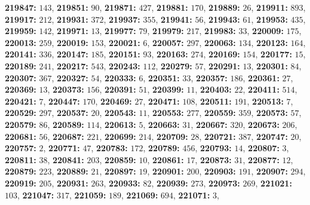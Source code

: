 \textsf{\bfseries 219847:} $143$, \textsf{\bfseries 219851:} $90$, \textsf{\bfseries 219871:} $427$, \textsf{\bfseries 219881:} $170$, \textsf{\bfseries 219889:} $26$, \textsf{\bfseries 219911:} $893$, \textsf{\bfseries 219917:} $212$, \textsf{\bfseries 219931:} $372$, \textsf{\bfseries 219937:} $355$, \textsf{\bfseries 219941:} $56$, \textsf{\bfseries 219943:} $61$, \textsf{\bfseries 219953:} $435$, \textsf{\bfseries 219959:} $142$, \textsf{\bfseries 219971:} $13$, \textsf{\bfseries 219977:} $79$, \textsf{\bfseries 219979:} $217$, \textsf{\bfseries 219983:} $33$, \textsf{\bfseries 220009:} $175$, \textsf{\bfseries 220013:} $259$, \textsf{\bfseries 220019:} $153$, \textsf{\bfseries 220021:} $6$, \textsf{\bfseries 220057:} $297$, \textsf{\bfseries 220063:} $134$, \textsf{\bfseries 220123:} $164$, \textsf{\bfseries 220141:} $336$, \textsf{\bfseries 220147:} $185$, \textsf{\bfseries 220151:} $93$, \textsf{\bfseries 220163:} $274$, \textsf{\bfseries 220169:} $154$, \textsf{\bfseries 220177:} $15$, \textsf{\bfseries 220189:} $241$, \textsf{\bfseries 220217:} $543$, \textsf{\bfseries 220243:} $112$, \textsf{\bfseries 220279:} $57$, \textsf{\bfseries 220291:} $13$, \textsf{\bfseries 220301:} $84$, \textsf{\bfseries 220307:} $367$, \textsf{\bfseries 220327:} $54$, \textsf{\bfseries 220333:} $6$, \textsf{\bfseries 220351:} $33$, \textsf{\bfseries 220357:} $186$, \textsf{\bfseries 220361:} $27$, \textsf{\bfseries 220369:} $13$, \textsf{\bfseries 220373:} $156$, \textsf{\bfseries 220391:} $51$, \textsf{\bfseries 220399:} $11$, \textsf{\bfseries 220403:} $22$, \textsf{\bfseries 220411:} $514$, \textsf{\bfseries 220421:} $7$, \textsf{\bfseries 220447:} $170$, \textsf{\bfseries 220469:} $27$, \textsf{\bfseries 220471:} $108$, \textsf{\bfseries 220511:} $191$, \textsf{\bfseries 220513:} $7$, \textsf{\bfseries 220529:} $297$, \textsf{\bfseries 220537:} $20$, \textsf{\bfseries 220543:} $11$, \textsf{\bfseries 220553:} $277$, \textsf{\bfseries 220559:} $359$, \textsf{\bfseries 220573:} $57$, \textsf{\bfseries 220579:} $86$, \textsf{\bfseries 220589:} $114$, \textsf{\bfseries 220613:} $5$, \textsf{\bfseries 220663:} $31$, \textsf{\bfseries 220667:} $320$, \textsf{\bfseries 220673:} $206$, \textsf{\bfseries 220681:} $56$, \textsf{\bfseries 220687:} $221$, \textsf{\bfseries 220699:} $214$, \textsf{\bfseries 220709:} $28$, \textsf{\bfseries 220721:} $387$, \textsf{\bfseries 220747:} $20$, \textsf{\bfseries 220757:} $2$, \textsf{\bfseries 220771:} $47$, \textsf{\bfseries 220783:} $172$, \textsf{\bfseries 220789:} $456$, \textsf{\bfseries 220793:} $14$, \textsf{\bfseries 220807:} $3$, \textsf{\bfseries 220811:} $38$, \textsf{\bfseries 220841:} $203$, \textsf{\bfseries 220859:} $10$, \textsf{\bfseries 220861:} $17$, \textsf{\bfseries 220873:} $31$, \textsf{\bfseries 220877:} $12$, \textsf{\bfseries 220879:} $223$, \textsf{\bfseries 220889:} $21$, \textsf{\bfseries 220897:} $19$, \textsf{\bfseries 220901:} $200$, \textsf{\bfseries 220903:} $191$, \textsf{\bfseries 220907:} $294$, \textsf{\bfseries 220919:} $205$, \textsf{\bfseries 220931:} $263$, \textsf{\bfseries 220933:} $82$, \textsf{\bfseries 220939:} $273$, \textsf{\bfseries 220973:} $269$, \textsf{\bfseries 221021:} $103$, \textsf{\bfseries 221047:} $317$, \textsf{\bfseries 221059:} $189$, \textsf{\bfseries 221069:} $694$, \textsf{\bfseries 221071:} $3$, 
